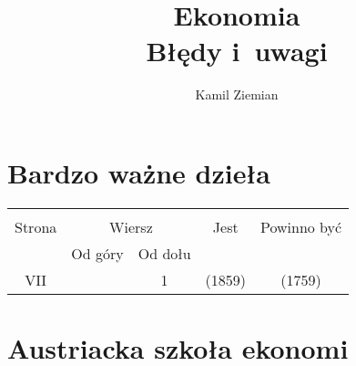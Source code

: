 \documentclass[a4paper,11pt]{article}
\title{Ekonomia \\
  Błędy i~uwagi}
\author{Kamil Ziemian}
\begin{document}





\maketitle %





\section{Bardzo ważne dzieła}

\vspace{\spaceTwo}







\begin{center}

  \begin{tabular}{|c|c|c|c|c|}
    \hline
    & \multicolumn{2}{c|}{} & & \\
    Strona & \multicolumn{2}{c|}{Wiersz} & Jest
                              & Powinno być \\ \cline{2-3}
    & Od góry & Od dołu & & \\
    \hline
    VII & & 1 & (1859) & (1759) \\
    \hline
  \end{tabular}

\end{center}


\vspace{\spaceOne}











\section{Austriacka szkoła ekonomi}
\end{document}
